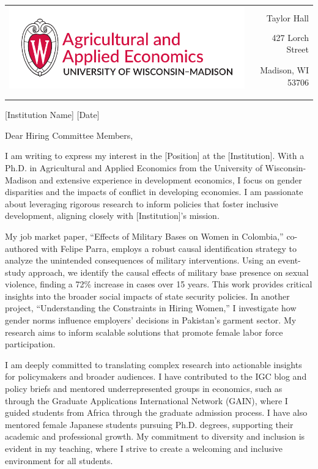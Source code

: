 \documentclass[12pt]{letter}
\begin{document}
\begin{tabularx}{\textwidth}{Xr}
\multirow{4}{*}{\includegraphics[height=3\baselineskip]{logo_cropped.pdf}} &  \\
& Taylor Hall \\
& 427 Lorch Street \\
& Madison, WI 53706 \\
[-1.8ex]\\
\\
\end{tabularx}

[Institution Name] \hfill [Date] \\

\medskip

Dear Hiring Committee Members,

I am writing to express my interest in the [Position] at the [Institution]. 
With a Ph.D. in Agricultural and Applied Economics from the University of Wisconsin-Madison and extensive experience 
in development economics, I focus on gender disparities and the impacts of conflict in developing economies. 
I am passionate about leveraging rigorous research to inform policies that foster inclusive development, 
aligning closely with [Institution]'s mission.

My job market paper, ``Effects of Military Bases on Women in Colombia,'' co-authored with Felipe Parra, employs 
a robust causal identification strategy to analyze the unintended consequences of military interventions. 
Using an event-study approach, we identify the causal effects of military base presence on sexual violence, finding 
a 72\% increase in cases over 15 years. This work provides critical insights into the broader social impacts of 
state security policies. In another project, ``Understanding the Constraints in Hiring Women,'' I investigate how gender 
norms influence employers' decisions in Pakistan's garment sector. My research aims to inform scalable solutions that 
promote female labor force participation.

I am deeply committed to translating complex research into actionable insights for policymakers and broader audiences. 
I have contributed to the IGC blog and policy briefs and mentored underrepresented groups in economics, such as through 
the Graduate Applications International Network (GAIN), where I guided students from Africa through the graduate admission 
process. I have also mentored female Japanese students pursuing Ph.D. degrees, supporting their academic and professional 
growth. My commitment to diversity and inclusion is evident in my teaching, where I strive to create a welcoming and 
inclusive environment for all students.
\end{document}
